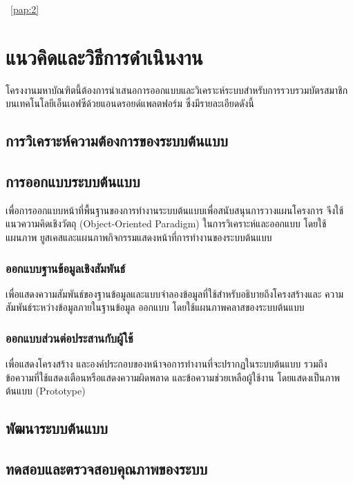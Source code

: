 \documentclass[a4paper]{article}
\begin{document}
~\ref{pap:2}


\section{แนวคิดและวิธีการดำเนินงาน}

โครงงานมหาบัณฑิตนี้ต้องการนําเสนอการออกแบบและวิเคราะห์ระบบสำหรับการรวบรวมบัตรสมาชิกบนเทคโนโลยีเอ็นเอฟซีด้วยแอนดรอยด์แพลตฟอร์ม ซึ่งมีรายละเอียดดังนี้

\subsection{การวิเคราะห์ความต้องการของระบบต้นแบบ}

\subsection{การออกแบบระบบต้นแบบ}

เพื่อการออกแบบหน้าที่พื้นฐานของการทํางานระบบต้นแบบเพื่อสนับสนุนการวางแผนโครงการ จึงใช้แนวความคิดเชิงวัตถุ (Object-Oriented Paradigm) ในการวิเคราะห์และออกแบบ โดยใช้แผนภาพ ยูสเคสและแผนภาพกิจกรรมแสดงหน้าที่การทํางานของระบบต้นแบบ

\subsubsection{ออกแบบฐานข้อมูลเชิงสัมพันธ์}

เพื่อแสดงความสัมพันธ์ของฐานข้อมูลและแบบจําลองข้อมูลที่ใช้สําหรับอธิบายถึงโครงสร้างและ ความสัมพันธ์ระหว่างข้อมูลภายในฐานข้อมูล ออกแบบ โดยใช้แผนภาพคลาสของระบบต้นแบบ

\subsubsection{ออกแบบส่วนต่อประสานกับผู้ใช้}

เพื่อแสดงโครงสร้าง และองค์ประกอบของหน้าจอการทํางานที่จะปรากฏในระบบต้นแบบ รวมถึงข้อความที่ใช้แสดงเตือนหรือแสดงความผิดพลาด และข้อความช่วยเหลือผู้ใช้งาน โดยแสดงเป็นภาพ ต้นแบบ (Prototype)

\subsection{พัฒนาระบบต้นแบบ}
\subsection{ทดสอบและตรวจสอบคุณภาพของระบบ}
\end{document}

